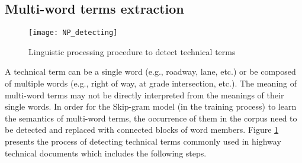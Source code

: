 \documentclass[Journal, InsideFigs, DoubleSpace]{ascelike} %
\begin{document}
\subsection{Multi-word terms extraction}
%
\begin{figure}[t]
\centering
\texttt{[image: NP\_detecting]}
\caption{Linguistic processing procedure to detect technical terms}
\label{fig:np_detect}
\end{figure}
%
A technical term can be a single word (e.g., roadway, lane, etc.) or be composed of multiple words (e.g., right of way, at grade intersection, etc.). The meaning of multi-word terms may not be directly interpreted from the meanings of their single words. In order for the Skip-gram model (in the training process) to learn the semantics of multi-word terms, the occurrence of them in the corpus need to be detected and replaced with connected blocks of word members. Figure \ref{fig:np_detect} presents the process of detecting technical terms commonly used in highway technical documents which includes the following steps. 
\par
\end{document}
